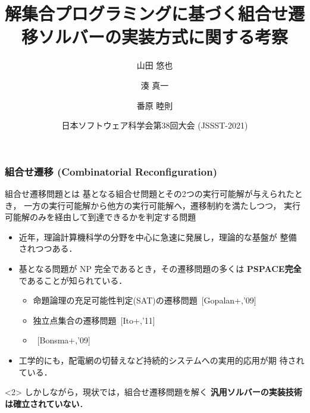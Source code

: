 \documentclass[dvipdfmx,11pt]{beamer}
\title{解集合プログラミングに基づく組合せ遷移ソルバーの実装方式に関する考察}
\author{山田 悠也\inst{1} \and 湊 真一\inst{2} \and 番原 睦則\inst{1}}
\date{日本ソフトウェア科学会第38回大会 (JSSST-2021)}
\institute{\inst{1}名古屋大学 大学院情報学研究科 \and \inst{2}京都大学 大学院情報学研究科}
\begin{document}
\maketitle
\begin{frame}
  \frametitle{組合せ遷移 (Combinatorial Reconfiguration)}
  \begin{alertblock}{組合せ遷移問題とは}
    基となる組合せ問題とその2つの実行可能解が与えられたとき，
    一方の実行可能解から他方の実行可能解へ，遷移制約を満たしつつ，
    実行可能解のみを経由して到達できるかを判定する問題
  \end{alertblock}

  \begin{itemize}
  \item 近年，理論計算機科学の分野を中心に急速に発展し，理論的な基盤が
    整備されつつある\footnotemark[1]．
  \item 基となる問題が NP 完全であるとき，その遷移問題の多くは
    \alert{\bf PSPACE完全}であることが知られている．
    \begin{itemize}
    \item 命題論理の充足可能性判定(SAT)の遷移問題~[Gopalan+,'09]
    \item 独立点集合の遷移問題~[Ito+,'11]
    \item {}~[Bonsma+,'09]
    \end{itemize}
  \item 工学的にも，配電網の切替えなど持続的システムへの実用的応用が期
    待されている．
  \end{itemize}

  \begin{alertblock}<2>{}\centering
    しかしながら，現状では，組合せ遷移問題を解く
    \alert{\bf 汎用ソルバーの実装技術は確立されていない}．
  \end{alertblock}

\end{frame}
\end{document}
